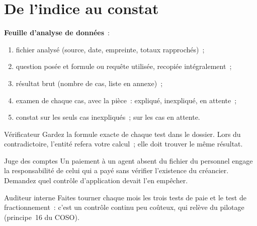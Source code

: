 \separateur

\section{De l'indice au constat}
\label{sec:c12-constat}

\begin{boxprocedure}
\textbf{Feuille d'analyse de données}~:
\begin{enumerate}
    \item fichier analysé (source, date, empreinte, totaux rapprochés)~;
    \item question posée et formule ou requête utilisée, recopiée
          intégralement~;
    \item résultat brut (nombre de cas, liste en annexe)~;
    \item examen de chaque cas, avec la pièce~: expliqué, inexpliqué, en
          attente~;
    \item constat sur les seuls cas inexpliqués~; \NEK{} sur les cas en
          attente.
\end{enumerate}
\end{boxprocedure}

\begin{boxmetier}{Vérificateur}
Gardez la formule exacte de chaque test dans le dossier. Lors du
contradictoire, l'entité refera votre calcul~; elle doit trouver le même
résultat.
\end{boxmetier}

\begin{boxmetier}{Juge des comptes}
Un paiement à un agent absent du fichier du personnel engage la
responsabilité de celui qui a payé sans vérifier l'existence du
créancier. Demandez quel contrôle d'application devait l'en empêcher.
\end{boxmetier}

\begin{boxmetier}{Auditeur interne}
Faites tourner chaque mois les trois tests de paie et le test de
fractionnement~: c'est un contrôle continu peu coûteux, qui relève du
pilotage (principe~16 du COSO).
\end{boxmetier}

\separateur

